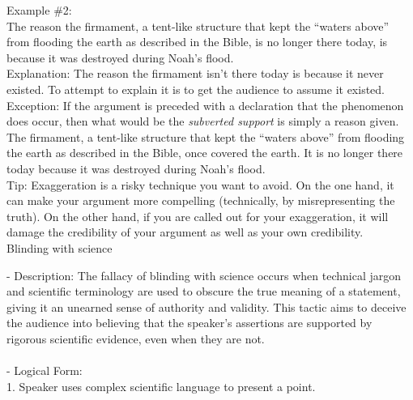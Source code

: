 \documentclass[a4paper,12pt,single,pdftex]{scrartcl}
\begin{document}
    
      Example \#2:
    \\

    
      The reason the firmament, a tent-like structure that kept the “waters above” from flooding the earth as described in the Bible, is no longer there today, is because it was destroyed during Noah’s flood.
    \\

    
      Explanation: The reason the firmament isn’t there today is because it never existed.  To attempt to explain it is to get the audience to assume it existed.
    \\

    
      Exception: If the argument is preceded with a declaration that the phenomenon does occur, then what would be the {\it subverted support }is simply a reason given.
    \\

    
      The firmament, a tent-like structure that kept the “waters above” from flooding the earth as described in the Bible, once covered the earth.  It is no longer there today because it was destroyed during Noah’s flood.
    \\

    
      Tip: Exaggeration is a risky technique you want to avoid. On the one hand, it can make your argument more compelling (technically, by misrepresenting the truth). On the other hand, if you are called out for your exaggeration, it will damage the credibility of your argument as well as your own credibility.
    \\

  

Blinding with science
    
      - Description: The fallacy of blinding with science occurs when technical jargon and scientific terminology are used to obscure the true meaning of a statement, giving it an unearned sense of authority and validity. This tactic aims to deceive the audience into believing that the speaker’s assertions are supported by rigorous scientific evidence, even when they are not.
    \\

    
      
    \\

    
      - Logical Form:
    \\

    
        1. Speaker uses complex scientific language to present a point.
    \\
\end{document}
